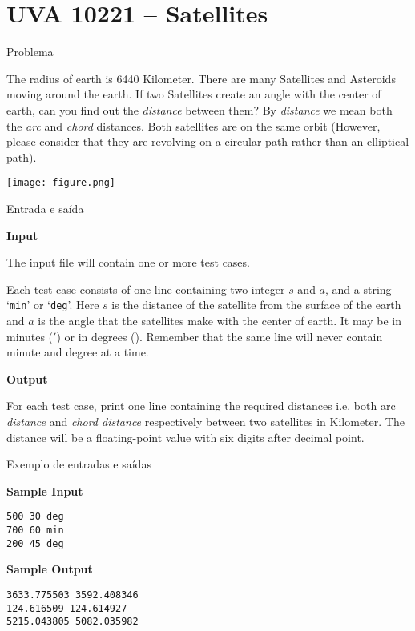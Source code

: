 \section{UVA 10221 -- Satellites}

\begin{frame}[fragile]{Problema}

\begin{minipage}{0.45\textwidth}
The radius of earth is 6440 Kilometer. There are many Satellites
and Asteroids moving around the earth. If two Satellites create
an angle with the center of earth, can you find out the \textit{distance}
between them? By \textit{distance} we mean both the \textit{arc} and \textit{chord}
distances. Both satellites are on the same orbit (However, please
consider that they are revolving on a circular path rather than
an elliptical path).
\end{minipage}
\begin{minipage}{0.5\textwidth}
\begin{center}
\texttt{[image: figure.png]}
\end{center}
\end{minipage}

\end{frame}

\begin{frame}[fragile]{Entrada e saída}

\textbf{Input}

The input file will contain one or more test cases.

Each test case consists of one line containing two-integer $s$
and $a$, and a string ‘\texttt{min}’ or ‘\texttt{deg}’. Here $s$ is the distance of the
satellite from the surface of the earth and $a$ is the angle that the
satellites make with the center of earth. It may be in minutes ($'$) or in degrees (\textdegree). Remember that the
same line will never contain minute and degree at a time.

\textbf{Output}

For each test case, print one line containing the required distances i.e. both arc \textit{distance}
 and \textit{chord distance} respectively between two satellites in Kilometer. The distance will be a floating-point value
with six digits after decimal point.

\end{frame}

\begin{frame}[fragile]{Exemplo de entradas e saídas}

\begin{minipage}[t]{0.5\textwidth}
\textbf{Sample Input}
\begin{verbatim}
500 30 deg
700 60 min
200 45 deg
\end{verbatim}
\end{minipage}
\begin{minipage}[t]{0.45\textwidth}
\textbf{Sample Output}
\begin{verbatim}
3633.775503 3592.408346
124.616509 124.614927
5215.043805 5082.035982
\end{verbatim}
\end{minipage}
\end{frame}

